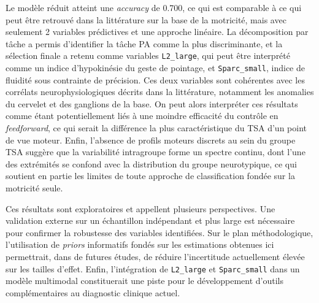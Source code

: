 \documentclass[11pt]{report}
\begin{document}
\medskip 

Le modèle réduit atteint une \textit{accuracy} de 0.700, ce qui est comparable à ce qui peut être retrouvé dans la littérature sur la base de la motricité, mais avec seulement 2 variables prédictives et une approche linéaire. %
La décomposition par tâche a permis d'identifier la tâche PA comme la plus discriminante, et la sélection finale a retenu comme variables \texttt{L2\_large}, qui peut être interprété comme un indice d'hypokinésie du geste de pointage, et \texttt{Sparc\_small}, indice de fluidité sous contrainte de précision. Ces deux variables sont cohérentes avec les corrélats neurophysiologiques décrits dans la littérature, notamment les anomalies du cervelet et des ganglions de la base. On peut alors interpréter ces résultats comme étant potentiellement liés à une moindre efficacité du contrôle en \textit{feedforward}, ce qui serait la différence la plus caractéristique du TSA d'un point de vue moteur. Enfin, l'absence de profils moteurs discrets au sein du groupe TSA suggère que la variabilité intragroupe forme un spectre continu, dont l'une des extrémités se confond avec la distribution du groupe neurotypique, ce qui soutient en partie les limites de toute approche de classification fondée sur la motricité seule.

\bigskip 

Ces résultats sont exploratoires et appellent plusieurs perspectives. Une validation externe sur un échantillon indépendant et plus large est nécessaire pour confirmer la robustesse des variables identifiées. Sur le plan méthodologique, l'utilisation de \textit{priors} informatifs fondés sur les estimations obtenues ici permettrait, dans de futures études, de réduire l'incertitude actuellement élevée sur les tailles d'effet. Enfin, l'intégration de \texttt{L2\_large} et \texttt{Sparc\_small} dans un modèle multimodal constituerait une piste pour le développement d'outils complémentaires au diagnostic clinique actuel.

\newpage
{}
\pagestyle{empty}

\begingroup
\small %
\printbibliography
%
%
\endgroup


\newpage





\end{document}
